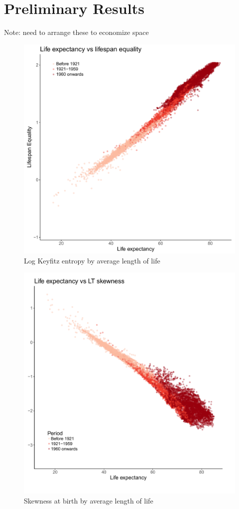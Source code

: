\documentclass{article}
\begin{document}
\FloatBarrier
\section*{Preliminary Results}
Note: need to arrange these to economize space
\begin{figure}
\caption{Log Keyfitz entropy by average length of life}
\centering
\includegraphics[scale=.5]{Figures/F3_Lifespan_equality}
\end{figure}

\begin{figure}
\caption{Skewness at birth by average length of life}
\centering
\includegraphics[scale=.5]{Figures/F2_Skew}
\end{figure}
\end{document}
